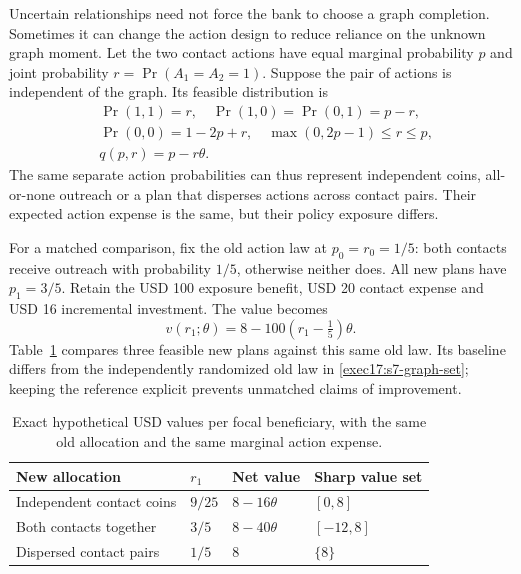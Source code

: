 Uncertain relationships need not force the bank to choose a graph completion.
Sometimes it can change the action design to reduce reliance on the unknown
graph moment. Let the two contact actions have equal marginal probability $p$
and joint probability $r=\Pr(A_1=A_2=1)$. Suppose the pair of actions is independent
of the graph. Its feasible distribution is
\begin{equation}
 \begin{split}
  &\Pr(1,1)=r,\quad \Pr(1,0)=\Pr(0,1)=p-r,\\
  &\Pr(0,0)=1-2p+r,\quad
      \max(0,2p-1)\leq r\leq p,\\
  &q(p,r)=p-r\theta.
 \end{split}
 \label{exec17:s7-action-law}
\end{equation}
The same separate action probabilities can thus represent independent coins,
all-or-none outreach or a plan that disperses actions across contact pairs.
Their expected action expense is the same, but their policy exposure differs.

For a matched comparison, fix the old action law at $p_0=r_0=1/5$: both
contacts receive outreach with probability $1/5$, otherwise neither does. All
new plans have $p_1=3/5$. Retain the USD 100 exposure benefit, USD 20 contact
expense and USD 16 incremental investment. The value becomes
\begin{equation}
 v(r_1;\theta)=8-100(r_1-\tfrac15)\theta.
 \label{exec17:s7-coordinated-value}
\end{equation}
Table~\ref{exec17:s7-policy-table} compares three feasible new plans against
this same old law. Its baseline differs from the independently randomized old
law in \eqref{exec17:s7-graph-set}; keeping the reference explicit prevents
unmatched claims of improvement.

\begin{table}[htbp]
\centering\small
\begin{tabular}{p{}p{}p{}p{}}
\toprule
New allocation & $r_1$ & Net value & Sharp value set\\
\midrule
Independent contact coins & $9/25$ & $8-16\theta$ & $[0,8]$\\
Both contacts together & $3/5$ & $8-40\theta$ & $[-12,8]$\\
Dispersed contact pairs & $1/5$ & $8$ & $\{8\}$\\
\bottomrule
\end{tabular}
\caption{Exact hypothetical USD values per focal beneficiary, with the same
old allocation and the same marginal action expense.}
\label{exec17:s7-policy-table}
\end{table}

